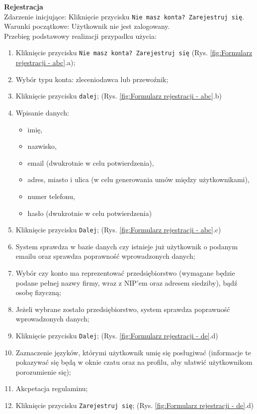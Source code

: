 \textbf{Rejestracja} \\
Zdarzenie inicjujące: Kliknięcie przycisku \texttt{Nie masz konta? Zarejestruj się}. \\
Warunki początkowe: Użytkownik nie jest zalogowany. \\
Przebieg podstawowy realizacji przypadku użycia:
\begin{enumerate}
    \item Kliknięcie przycisku \texttt{Nie masz konta? Zarejestruj się} (Rys. \ref{fig:Formularz rejestracji - abc}.a);
    \item Wybór typu konta: zleceniodawca lub przewoźnik;
    \item Kliknięcie przycisku \texttt{dalej}; (Rys. \ref{fig:Formularz rejestracji - abc}.b)
    \item Wpisanie danych:
        \begin{itemize}
            \item imię,
            \item nazwisko,
            \item email (dwukrotnie w celu potwierdzenia),
            \item adres, miasto i ulica (w celu generowania umów między użytkownikami),
            \item numer telefonu,
            \item hasło (dwukrotnie w celu potwierdzenia)
        \end{itemize}
    \item Kliknięcie przycisku \texttt{Dalej}; (Rys. \ref{fig:Formularz rejestracji - abc}.c)
    \item System sprawdza w bazie danych czy istnieje już użytkownik o podanym emailu oraz sprawdza poprawność wprowadzonych danych;
    \item Wybór czy konto ma reprezentować przedsiębiorstwo (wymagane będzie podane pełnej nazwy firmy, wraz z NIP'em oraz adresem siedziby), bądź osobę fizyczną;
    \item Jeżeli wybrane zostało przedsiębiorstwo, system sprawdza poprawność wprowadzonych danych;
    \item Kliknięcie przycisku \texttt{Dalej}; (Rys. \ref{fig:Formularz rejestracji - de}.d)
    \item Zaznaczenie języków, którymi użytkownik umię się posługiwać (informacje te pokazywać się będą w oknie czatu oraz na profilu, aby ułatwić użytkownikom porozumienie się);
    \item Akcpetacja regulaminu;
    \item Kliknięcie przycisku \texttt{Zarejestruj się}; (Rys. \ref{fig:Formularz rejestracji - de}.d)
\end{enumerate}
